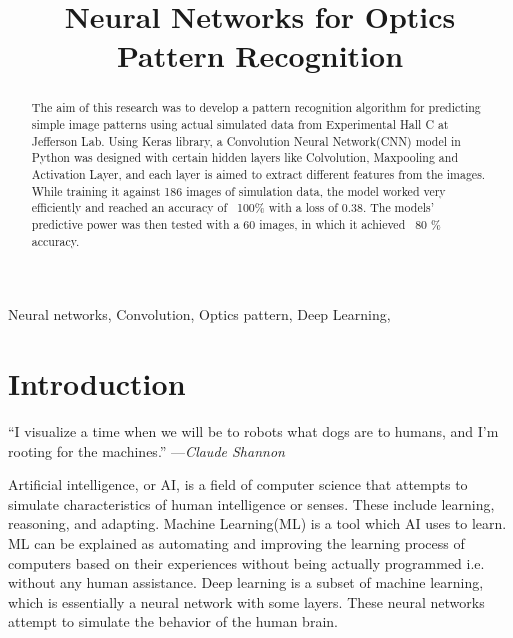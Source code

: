 \documentclass[conference]{IEEEtran}
\begin{document}

\title{Neural Networks for Optics Pattern Recognition
}

\author{
} 

\maketitle

\thispagestyle{plain}
\pagestyle{plain}
\begin{abstract}
The aim of this research was to develop a pattern recognition algorithm for predicting
simple image patterns using actual simulated data from Experimental Hall C at Jefferson Lab. 
Using Keras library, a Convolution Neural Network(CNN) model in Python was designed with certain hidden layers like Colvolution, Maxpooling and Activation Layer, and each layer is aimed to extract different features from the images.
While training it against 186 images of simulation data, the model worked very efficiently and reached an accuracy of ~100\% with a loss of 0.38. The models' predictive power was then tested with a 60 images, in which it achieved ~80 \% accuracy.\\
\end{abstract}

\begin{IEEEkeywords}
Neural networks, Convolution, Optics pattern, Deep Learning, 
\end{IEEEkeywords}

\section{\textbf{Introduction}}

“I visualize a time when we will be to robots what dogs are to humans, and I’m rooting for the machines.” —\emph{Claude Shannon}

Artificial intelligence, or AI, is a field of computer science that attempts to simulate characteristics of human intelligence or senses. These include learning, reasoning, and adapting. 
Machine Learning(ML) is a tool which AI uses to learn. ML can be explained as automating and improving the learning process of computers based on their experiences without being actually programmed i.e. without any human assistance.
Deep learning is a subset of machine learning, which is essentially a neural network with some layers. These neural networks attempt to simulate the behavior of the human brain.
\end{document}

